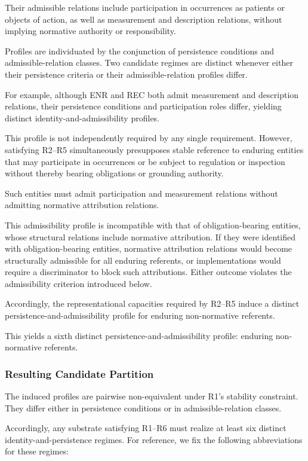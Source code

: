 Their admissible relations include
participation in occurrences as patients or objects of action,
as well as measurement and description relations,
without implying normative authority or responsibility.

Profiles are individuated by the conjunction of
persistence conditions and admissible-relation classes.
Two candidate regimes are distinct whenever either their
persistence criteria or their admissible-relation profiles differ.

For example, although ENR and REC both admit measurement and description relations,
their persistence conditions and participation roles differ,
yielding distinct identity-and-admissibility profiles.

This profile is not independently required by any single requirement.
However, satisfying R2--R5 simultaneously presupposes
stable reference to enduring entities that may participate
in occurrences or be subject to regulation or inspection
without thereby bearing obligations or grounding authority.

Such entities must admit participation and measurement relations
without admitting normative attribution relations.

This admissibility profile is incompatible with that of
obligation-bearing entities, whose structural relations
include normative attribution.
If they were identified with obligation-bearing entities,
normative attribution relations would become structurally admissible
for all enduring referents, or implementations would require
a discriminator to block such attributions.
Either outcome violates the admissibility criterion introduced below.

Accordingly, the representational capacities required by R2--R5
induce a distinct persistence-and-admissibility profile
for enduring non-normative referents.

This yields a sixth distinct persistence-and-admissibility profile:
enduring non-normative referents.

\subsubsection{Resulting Candidate Partition}

The induced profiles are pairwise non-equivalent under R1's stability constraint.
They differ either in persistence conditions or in admissible-relation classes.

Accordingly, any substrate satisfying R1--R6
must realize at least six distinct identity-and-persistence regimes.
For reference, we fix the following abbreviations
for these regimes:

